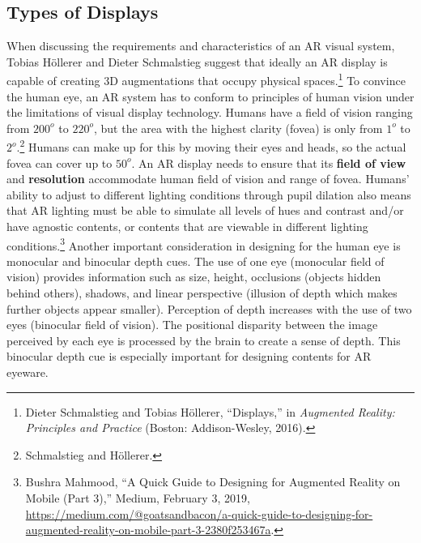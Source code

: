 \subsection{Types of Displays}
When discussing the requirements and characteristics of an AR visual system, Tobias Höllerer and Dieter Schmalstieg suggest that ideally an AR display is capable of creating 3D augmentations that occupy physical spaces.\footnote{Dieter Schmalstieg and Tobias Höllerer, “Displays,” in \textit{Augmented Reality: Principles and Practice} (Boston: Addison-Wesley, 2016).} To convince the human eye, an AR system has to conform to principles of human vision under the limitations of visual display technology. Humans have a field of vision ranging from $200^o$ to $220^o$, but the area with the highest clarity (fovea) is only from $1^o$ to $2^o$.\footnote{Schmalstieg and Höllerer.} Humans can make up for this by moving their eyes and heads, so the actual fovea can cover up to $50^o$. An AR display needs to ensure that its \textbf{field of view} and \textbf{resolution} accommodate human field of vision and range of fovea. Humans' ability to adjust to different lighting conditions through pupil dilation also means that AR lighting must be able to simulate all levels of hues and contrast and/or have agnostic contents, or contents that are viewable in different lighting conditions.\footnote{Bushra Mahmood, “A Quick Guide to Designing for Augmented Reality on Mobile (Part 3),” Medium, February 3, 2019, \url{https://medium.com/@goatsandbacon/a-quick-guide-to-designing-for-augmented-reality-on-mobile-part-3-2380f253467a}.} Another important consideration in designing for the human eye is monocular and binocular depth cues. The use of one eye (monocular field of vision) provides information such as size, height, occlusions (objects hidden behind others), shadows, and linear perspective (illusion of depth which makes further objects appear smaller). Perception of depth increases with the use of two eyes (binocular field of vision). The positional disparity between the image perceived by each eye is processed by the brain to create a sense of depth. This binocular depth cue is especially important for designing contents for AR eyeware.

\begin{figure}[!ht]
\vspace{-.1 in}
\end{figure}

